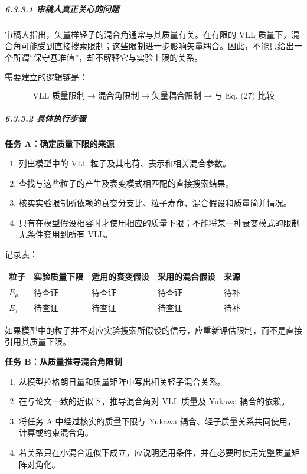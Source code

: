 \documentclass[
]{article}
\providecommand{\tightlist}{%
  \setlength{\itemsep}{0pt}\setlength{\parskip}{0pt}}
\begin{document}
\subparagraph{6.3.3.1
审稿人真正关心的问题}\label{ux5ba1ux7a3fux4ebaux771fux6b63ux5173ux5fc3ux7684ux95eeux9898-2}

审稿人指出，矢量样轻子的混合角通常与其质量有关。在有限的 VLL
质量下，混合角可能受到直接搜索限制；这些限制进一步影响矢量耦合。因此，不能只给出一个所谓``保守基准值''，却不解释它与实验上限的关系。

需要建立的逻辑链是：

\[
\boxed{
\text{VLL 质量限制}
\longrightarrow
\text{混合角限制}
\longrightarrow
\text{矢量耦合限制}
\longrightarrow
\text{与 Eq. (27) 比较}
}
\]

\subparagraph{6.3.3.2
具体执行步骤}\label{ux5177ux4f53ux6267ux884cux6b65ux9aa4-2}

\textbf{任务 A：确定质量下限的来源}

\begin{enumerate}
\def\labelenumi{\arabic{enumi}.}
\tightlist
\item
  列出模型中的 VLL 粒子及其电荷、表示和相关混合参数。
\item
  查找与这些粒子的产生及衰变模式相匹配的直接搜索结果。
\item
  核实实验限制所依赖的衰变分支比、粒子寿命、混合假设和质量简并情况。
\item
  只有在模型假设相容时才使用相应的质量下限；不能将某一种衰变模式的限制无条件套用到所有
  VLL。
\end{enumerate}

记录表：

\begin{longtable}[]{@{}lllll@{}}
\toprule\noalign{}
粒子 & 实验质量下限 & 适用的衰变假设 & 采用的混合假设 & 来源 \\
\midrule\noalign{}
\endhead
\bottomrule\noalign{}
\endlastfoot
\(E_\mu\) & 待查证 & 待查证 & 待查证 & 待补 \\
\(E_\tau\) & 待查证 & 待查证 & 待查证 & 待补 \\
\end{longtable}

如果模型中的粒子并不对应实验搜索所假设的信号，应重新评估限制，而不是直接引用其质量下限。

\textbf{任务 B：从质量推导混合角限制}

\begin{enumerate}
\def\labelenumi{\arabic{enumi}.}
\tightlist
\item
  从模型拉格朗日量和质量矩阵中写出相关轻子混合关系。
\item
  在与论文一致的近似下，推导混合角对 VLL 质量及 Yukawa 耦合的依赖。
\item
  将任务 A 中经过核实的质量下限与 Yukawa
  耦合、轻子质量关系共同使用，计算或约束混合角。
\item
  若关系只在小混合近似下成立，应说明适用条件，并在必要时使用完整质量矩阵对角化。
\end{enumerate}
\end{document}
